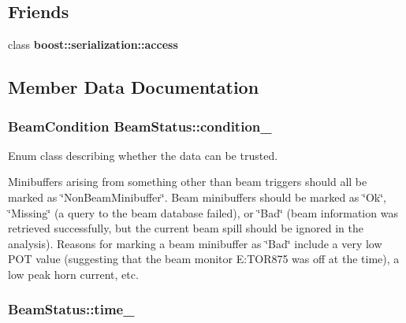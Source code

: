 \subsection*{Friends}
\begin{DoxyCompactItemize}
\item 
\hypertarget{classBeamStatus_ac98d07dd8f7b70e16ccb9a01abf56b9c}{class {\bfseries boost\-::serialization\-::access}}\label{classBeamStatus_ac98d07dd8f7b70e16ccb9a01abf56b9c}

\end{DoxyCompactItemize}


\subsection{Member Data Documentation}
\hypertarget{classBeamStatus_a8e81a7fca77f64c2ce0e41bd0e14c3ea}{
\subsubsection[{condition\-\_\-}]{\setlength{\rightskip}{0pt plus 5cm}Beam\-Condition Beam\-Status\-::condition\-\_\-\hspace{0.3cm}{\ttfamily [protected]}}}\label{classBeamStatus_a8e81a7fca77f64c2ce0e41bd0e14c3ea}


Enum class describing whether the data can be trusted. 

Minibuffers arising from something other than beam triggers should all be marked as \char`\"{}\-Non\-Beam\-Minibuffer\char`\"{}. Beam minibuffers should be marked as \char`\"{}\-Ok\char`\"{}, \char`\"{}\-Missing\char`\"{} (a query to the beam database failed), or \char`\"{}\-Bad\char`\"{} (beam information was retrieved successfully, but the current beam spill should be ignored in the analysis). Reasons for marking a beam minibuffer as \char`\"{}\-Bad\char`\"{} include a very low P\-O\-T value (suggesting that the beam monitor E\-:T\-O\-R875 was off at the time), a low peak horn current, etc. \hypertarget{classBeamStatus_a499b220ec0c80ce883d19f8f9520934d}{
\subsubsection[{time\-\_\-}]{ Beam\-Status\-::time\-\_\-\hspace{0.3cm}{\ttfamily [protected]}}}\label{classBeamStatus_a499b220ec0c80ce883d19f8f9520934d}


